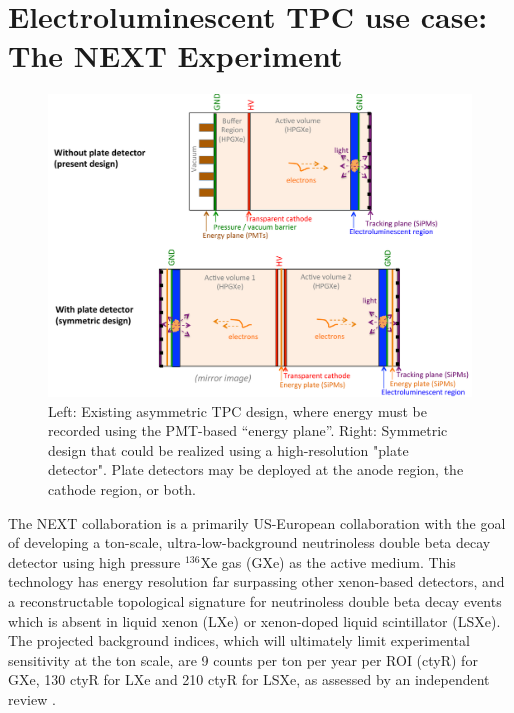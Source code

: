 \section{Electroluminescent TPC use case: The NEXT Experiment}
\begin{figure}[t]
\begin{centering}
\includegraphics[width=0.85\columnwidth]{./images/PlateDetectorNEXT.pdf}
\par\end{centering}

\caption{Left: Existing asymmetric TPC design, where energy must be recorded using the PMT-based ``energy plane''.  Right: Symmetric design that could be realized using a high-resolution "plate detector".  Plate detectors may be deployed at the anode region, the cathode region, or both. \label{fig:PlateDetectorNEXT}}
\end{figure}


The NEXT collaboration is a primarily US-European collaboration with the goal of developing a ton-scale, ultra-low-background neutrinoless double beta decay detector using high pressure $^{136}$Xe gas (GXe) as the active medium.  This technology has energy resolution far surpassing other xenon-based detectors, and a reconstructable topological signature for neutrinoless double beta decay events which is absent in liquid xenon (LXe) or xenon-doped liquid scintillator (LSXe).  The projected background indices, which will ultimately limit experimental sensitivity at the ton scale, are 9 counts per ton per year per ROI (ctyR) for GXe, 130 ctyR for LXe and 210 ctyR for LSXe, as assessed by an independent review \cite{LRP}.

